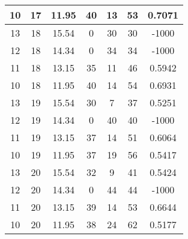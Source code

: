\documentclass[letterpaper, 12pt]{article}
\begin{document}
\begin{longtable}{|c|c|c|c|c|c|c|}
10 & 17 & 11.95 & 40 & 13 & 53 & 0.7071 \\
\hline
13 & 18 & 15.54 & 0 & 30 & 30 & -1000 \\
\hline
12 & 18 & 14.34 & 0 & 34 & 34 & -1000 \\
\hline
11 & 18 & 13.15 & 35 & 11 & 46 & 0.5942 \\
\hline
10 & 18 & 11.95 & 40 & 14 & 54 & 0.6931 \\
\hline
13 & 19 & 15.54 & 30 & 7 & 37 & 0.5251 \\
\hline
12 & 19 & 14.34 & 0 & 40 & 40 & -1000 \\
\hline
11 & 19 & 13.15 & 37 & 14 & 51 & 0.6064 \\
\hline
10 & 19 & 11.95 & 37 & 19 & 56 & 0.5417 \\
\hline
13 & 20 & 15.54 & 32 & 9 & 41 & 0.5424 \\
\hline
12 & 20 & 14.34 & 0 & 44 & 44 & -1000 \\
\hline
11 & 20 & 13.15 & 39 & 14 & 53 & 0.6644 \\
\hline
10 & 20 & 11.95 & 38 & 24 & 62 & 0.5177 \\
\hline
\end{longtable}
\end{document}
